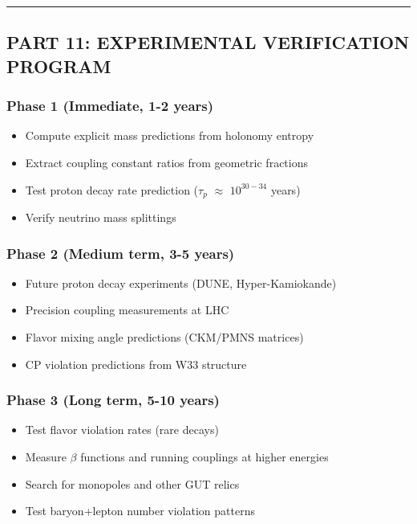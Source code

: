 \documentclass[11pt]{article}
\providecommand{\tightlist}{%
  \setlength{\itemsep}{0pt}\setlength{\parskip}{0pt}}
\begin{document}
\begin{center}\rule{0.5\linewidth}{0.5pt}\end{center}

\subsection{PART 11: EXPERIMENTAL VERIFICATION
PROGRAM}\label{part-11-experimental-verification-program}

\subsubsection{Phase 1 (Immediate, 1-2
years)}\label{phase-1-immediate-1-2-years}

\begin{itemize}
\tightlist
\item[$\square$]
  Compute explicit mass predictions from holonomy entropy
\item[$\square$]
  Extract coupling constant ratios from geometric fractions
\item[$\square$]
  Test proton decay rate prediction (\(\ensuremath{\tau}_{p}\)
  \ensuremath{\approx} \(10^{30-34}\) years)
\item[$\square$]
  Verify neutrino mass splittings
\end{itemize}

\subsubsection{Phase 2 (Medium term, 3-5
years)}\label{phase-2-medium-term-3-5-years}

\begin{itemize}
\tightlist
\item[$\square$]
  Future proton decay experiments (DUNE, Hyper-Kamiokande)
\item[$\square$]
  Precision coupling measurements at LHC
\item[$\square$]
  Flavor mixing angle predictions (CKM/PMNS matrices)
\item[$\square$]
  CP violation predictions from W33 structure
\end{itemize}

\subsubsection{Phase 3 (Long term, 5-10
years)}\label{phase-3-long-term-5-10-years}

\begin{itemize}
\tightlist
\item[$\square$]
  Test flavor violation rates (rare decays)
\item[$\square$]
  Measure \ensuremath{\beta} functions and running couplings at higher
  energies
\item[$\square$]
  Search for monopoles and other GUT relics
\item[$\square$]
  Test baryon+lepton number violation patterns
\end{itemize}
\end{document}
